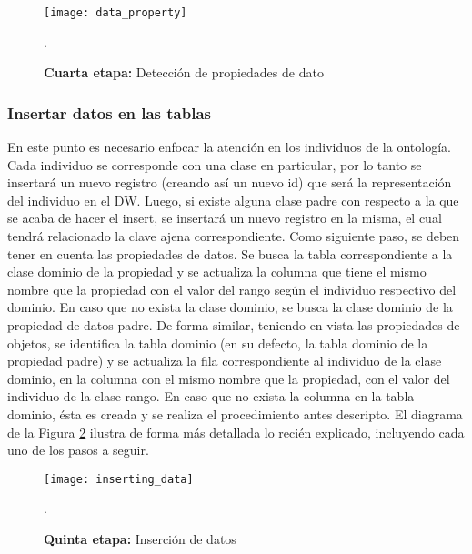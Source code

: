 \documentclass[a4paper,11pt]{article}
\begin{document}
    \begin{figure}[!htb]
      \begin{center}
        \texttt{[image: data\_property]}
        \caption{\textbf{Cuarta etapa:} Detección de propiedades de dato} \cite[p.~21]{ontologias}.
        \label{dataProperty}
      \end{center}
    \end{figure}
    
    
    \subsubsection{Insertar datos en las tablas}
    
    En este punto es necesario enfocar la atención en los individuos de la ontología. Cada individuo se corresponde con una clase en particular, por lo tanto se
    insertará un nuevo registro (creando así un nuevo id) que será la representación del individuo en el DW. Luego, si existe alguna clase padre con respecto a la
    que se acaba de hacer el insert, se insertará un nuevo registro en la misma, el cual tendrá relacionado la clave ajena correspondiente. Como siguiente paso,
    se deben tener en cuenta las propiedades de datos. Se busca la tabla correspondiente a la clase dominio de la propiedad y se actualiza la columna que tiene el
    mismo nombre que la propiedad con el valor del rango según el individuo respectivo del dominio. En caso que no exista la clase dominio, se busca la clase
    dominio de la propiedad de datos padre. De forma similar, teniendo en vista las propiedades de objetos,  se identifica la tabla dominio (en su defecto, la 
    tabla dominio de la propiedad padre) y se actualiza la fila correspondiente al individuo de la clase dominio, en la columna con el mismo nombre que la
    propiedad, con el valor del individuo de la clase rango. En caso que no exista la columna en la tabla dominio, ésta es creada y se realiza el procedimiento
    antes descripto. El diagrama de la Figura \ref{insertingData} ilustra de forma más detallada lo recién explicado, incluyendo cada uno de los pasos a seguir.
    
    \begin{figure}[!htb]
      \begin{center}
        \texttt{[image: inserting\_data]}
        \caption{\textbf{Quinta etapa:} Inserción de datos} \cite[p.~22]{ontologias}.
        \label{insertingData}
      \end{center}
    \end{figure}
    
\end{document}
